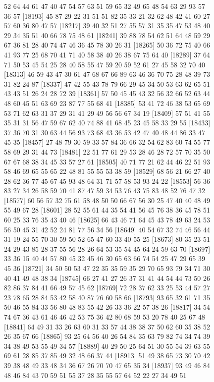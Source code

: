\documentclass{article}
\begin{document}
\begin{figure}[H]
\begin{Schunk}
\begin{Soutput}
[18169] 52 64 44 61 47 40 47 54 57 63 51 59 65 32 49 65 48 54 63 29 93 57 36 57
[18193] 45 87 29 22 31 51 51 82 35 33 21 32 62 48 42 41 60 27 57 60 36 80 47 57
[18217] 39 40 32 51 27 55 57 31 35 35 47 53 48 40 29 34 35 51 40 66 78 75 48 61
[18241] 39 88 78 54 62 51 64 48 59 29 67 36 81 28 40 74 47 46 36 45 78 30 26 31
[18265] 50 36 72 75 40 66 41 93 77 25 68 70 41 71 40 58 38 40 26 38 67 75 64 40
[18289] 37 64 71 50 53 45 54 25 28 40 58 55 47 59 20 59 52 61 27 45 58 32 70 40
[18313] 46 59 43 47 30 61 47 68 67 66 89 63 46 36 70 75 28 48 39 73 31 82 24 87
[18337] 47 42 55 43 78 79 66 29 45 34 50 53 63 62 65 51 43 43 51 26 24 28 72 39
[18361] 57 50 45 45 43 32 56 32 66 52 63 44 48 60 45 51 63 69 23 87 77 55 68 41
[18385] 53 41 72 46 38 53 65 69 53 71 62 63 31 37 29 31 41 29 49 56 56 67 34 19
[18409] 57 51 41 55 35 31 31 56 47 59 67 62 40 74 88 41 68 45 23 45 58 33 29 55
[18433] 37 36 70 31 30 63 44 56 93 73 68 43 36 53 42 47 40 48 44 86 33 47 45 35
[18457] 27 48 79 30 59 33 57 84 36 66 32 54 62 83 60 74 55 77 58 69 29 31 44 73
[18481] 22 51 77 61 29 53 28 46 28 72 57 70 35 50 67 67 68 38 34 45 33 57 27 61
[18505] 40 71 77 21 62 44 46 22 51 93 58 46 69 65 55 65 22 48 81 55 55 53 38 59
[18529] 68 56 21 66 27 40 28 62 36 77 45 67 45 93 48 64 31 71 57 58 53 93 24 22
[18553] 56 36 83 27 34 26 58 59 70 41 87 47 59 34 53 76 43 75 83 48 52 76 47 32
[18577] 60 56 57 32 75 61 58 48 50 50 66 67 56 30 25 47 40 40 48 49 55 49 67 28
[18601] 28 52 55 61 44 35 54 41 56 45 76 38 36 45 78 51 60 25 33 76 35 43 40 46
[18625] 66 43 46 71 64 45 43 78 49 63 24 53 56 50 45 31 42 52 24 81 77 56 34 56
[18649] 40 54 67 32 74 46 56 44 31 19 24 55 70 30 59 50 52 65 47 60 33 40 55 25
[18673] 80 35 23 51 24 29 43 85 28 37 55 56 28 26 64 53 35 54 45 64 24 59 63 70
[18697] 33 36 15 40 44 57 80 45 32 45 46 30 65 63 66 74 54 25 47 29 65 39 45 36
[18721] 34 50 50 53 47 22 35 35 59 35 29 70 65 93 79 34 71 30 40 41 49 48 38 34
[18745] 66 27 41 27 26 37 31 41 44 54 44 73 50 26 82 86 37 84 41 66 49 57 45 62
[18769] 72 28 37 62 33 25 53 44 57 27 23 78 65 28 84 53 42 58 40 87 76 60 58 66
[18793] 93 65 32 61 71 35 50 46 55 84 33 56 80 48 83 55 42 26 33 36 22 57 38 26
[18817] 34 54 74 67 36 43 61 46 46 42 53 75 36 42 80 68 59 53 20 78 40 25 67 48
[18841] 64 49 31 33 26 63 60 31 33 57 44 38 38 37 50 62 60 35 38 52 26 35 67 66
[18865] 93 25 64 56 40 26 54 84 35 63 79 82 74 34 74 39 34 38 49 53 55 49 34 57
[18889] 40 29 50 25 64 51 30 55 54 39 63 55 69 61 28 85 37 85 49 32 48 66 37 44
[18913] 51 49 38 65 73 30 70 42 39 38 48 49 33 48 34 36 67 26 70 70 47 65 35 34
[18937] 93 49 46 84 48 46 84 43 70 59 51 55 37 28 35 55 57 64 52 22 27 34 49 51

\end{Soutput}
\end{Schunk}
\end{figure}
\end{document}
